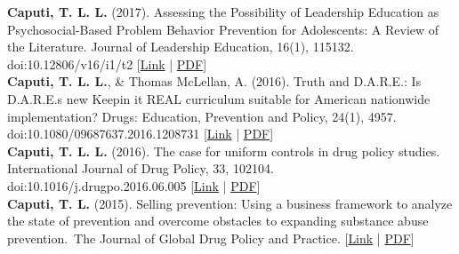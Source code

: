 \textbf{\textbf{Caputi, T. L.} L.} (2017). Assessing the Possibility of Leadership Education as Psychosocial-Based Problem Behavior Prevention for Adolescents: A Review of the Literature. Journal of Leadership Education, 16(1), 115132. doi:10.12806/v16/i1/t2 [\href{https://journalofleadershiped.org/wp-content/uploads/2019/02/16_1_caputi.pdf}{Link} | \href{https://www.theodorecaputi.com/files/JOLE-2017.pdf}{PDF}] \\[.2cm]
\textbf{\textbf{Caputi, T. L.} L.}, & Thomas McLellan, A. (2016). Truth and D.A.R.E.: Is D.A.R.E.s new Keepin it REAL curriculum suitable for American nationwide implementation? Drugs: Education, Prevention and Policy, 24(1), 4957. doi:10.1080/09687637.2016.1208731 [\href{https://www.tandfonline.com/doi/full/10.1080/09687637.2016.1208731}{Link} | \href{https://www.theodorecaputi.com/files/DEPP-2016.pdf}{PDF}] \\[.2cm]
\textbf{\textbf{Caputi, T. L.} L.} (2016). The case for uniform controls in drug policy studies. International Journal of Drug Policy, 33, 102104. doi:10.1016/j.drugpo.2016.06.005 [\href{https://www.sciencedirect.com/science/article/abs/pii/S095539591630175X}{Link} | \href{https://www.theodorecaputi.com/files/IJDP-2016.pdf}{PDF}] \\[.2cm]
\textbf{Caputi, T. L.} (2015). Selling prevention: Using a business framework to analyze the state of prevention and overcome obstacles to expanding substance abuse prevention. The Journal of Global Drug Policy and Practice. [\href{https://www.dfaf.org/wp-content/uploads/2018/11/Vol-9-Issue-1.pdf}{Link} | \href{https://www.theodorecaputi.com/files/JGDPP-2015.pdf}{PDF}] \\[.2cm]

